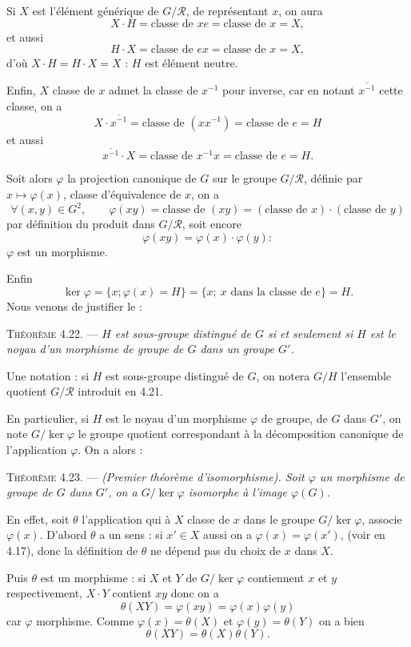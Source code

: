 Si $X$ est l'élément générique de $G/\mathcal R$, de représentant $x$, on aura
\[
X\cdot H=\text{classe de }xe=\text{classe de }x=X,
\]
et aussi
\[
H\cdot X=\text{classe de }ex=\text{classe de }x=X,
\]
d'où $X\cdot H=H\cdot X=X$ : $H$ est élément neutre.

Enfin, $X$ classe de $x$ admet la classe de $x^{-1}$ pour inverse, car en notant $\overline{x^{-1}}$ cette classe, on a
\[
X\cdot\overline{x^{-1}}=\text{classe de }(xx^{-1})=\text{classe de }e=H
\]
et aussi
\[
\overline{x^{-1}}\cdot X=\text{classe de }x^{-1}x=\text{classe de }e=H.
\]

Soit alors $\varphi$ la projection canonique de $G$ sur le groupe $G/\mathcal R$, définie par $x\mapsto\varphi(x)$, classe d'équivalence de $x$, on a
\[
\forall(x,y)\in G^2,\qquad
\varphi(xy)=\text{classe de }(xy)=(\text{classe de }x)\cdot(\text{classe de }y)
\]
par définition du produit dans $G/\mathcal R$, soit encore
\[
\varphi(xy)=\varphi(x)\cdot\varphi(y) :
\]
$\varphi$ est un morphisme.

Enfin
\[
\ker\varphi=\{x;\varphi(x)=H\}=\{x;\ x\text{ dans la classe de }e\}=H.
\]
Nous venons de justifier le :

\medskip\noindent\textsc{Théorème 4.22.} --- \emph{$H$ est sous-groupe distingué de $G$ si et seulement si $H$ est le noyau d'un morphisme de groupe de $G$ dans un groupe $G'$.}

Une notation : si $H$ est sous-groupe distingué de $G$, on notera $G/H$ l'ensemble quotient $G/\mathcal R$ introduit en 4.21.

En particulier, si $H$ est le noyau d'un morphisme $\varphi$ de groupe, de $G$ dans $G'$, on note $G/\ker\varphi$ le groupe quotient correspondant à la décomposition canonique de l'application $\varphi$. On a alors :

\medskip\noindent\textsc{Théorème 4.23.} --- \emph{(Premier théorème d'isomorphisme). Soit $\varphi$ un morphisme de groupe de $G$ dans $G'$, on a $G/\ker\varphi$ isomorphe à l'image $\varphi(G)$.}

En effet, soit $\theta$ l'application qui à $X$ classe de $x$ dans le groupe $G/\ker\varphi$, associe $\varphi(x)$. D'abord $\theta$ a un sens : si $x'\in X$ aussi on a $\varphi(x)=\varphi(x')$, (voir en 4.17), donc la définition de $\theta$ ne dépend pas du choix de $x$ dans $X$.

Puis $\theta$ est un morphisme : si $X$ et $Y$ de $G/\ker\varphi$ contiennent $x$ et $y$ respectivement, $X\cdot Y$ contient $xy$ donc on a
\[
\theta(XY)=\varphi(xy)=\varphi(x)\varphi(y)
\]
car $\varphi$ morphisme. Comme $\varphi(x)=\theta(X)$ et $\varphi(y)=\theta(Y)$ on a bien
\[
\theta(XY)=\theta(X)\theta(Y).
\]

